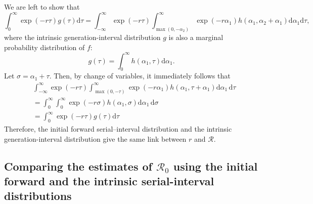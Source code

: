 \documentclass[12pt]{article}
\newcommand{\Rx}[1]{\ensuremath{{\mathcal R}_{#1}}\xspace}
\newcommand{\Ro}{\Rx{0}}
\newcommand{\RR}{\ensuremath{{\mathcal R}}\xspace}
\newcommand{\pinf}{\ensuremath{\alpha_1}} %
\newcommand{\sinf}{\ensuremath{\alpha_2}} %
\begin{document}
We are left to show that 
\begin{equation}
\int_0^{\infty} \exp(-r\tau) g(\tau) \mathrm{d}\tau = \int_{-\infty}^\infty \exp(-r\tau) \int_{\max{(0,-\sinf)}}^{\infty} \exp(-r\pinf) h(\pinf, \sinf + \pinf) \mathrm{d}\pinf \mathrm{d}\tau,
\end{equation}
where the intrinsic generation-interval distribution $g$ is also a marginal probability distribution of $f$:
\begin{equation}
g(\tau) = \int_0^\infty h(\pinf, \tau)  \mathrm{d} \pinf.
\end{equation}
Let $\sigma = \pinf + \tau$. Then, by change of variables, it immediately follows that
\begin{equation}
\begin{aligned}
&\int_{-\infty}^{\infty} \exp(-r\tau) \int_{\max(0, -\tau)}^\infty \exp(- r \pinf) h(\pinf, \tau+\pinf) \mathrm{d} \pinf\, \mathrm{d}\tau\\
&=\int_{0}^{\infty} \int_{0}^\infty \exp(- r \sigma) h(\pinf, \sigma) \mathrm{d} \pinf\, \mathrm{d}\sigma\\
&=\int_{0}^{\infty} \exp(-r\tau) g(\tau) \mathrm{d}\tau
\end{aligned}
\end{equation}
Therefore, the initial forward serial--interval distribution and the intrinsic generation-interval distribution give the same link between $r$ and \RR.

\subsection{Comparing the estimates of \Ro using the initial forward and the intrinsic serial-interval distributions}
\end{document}
